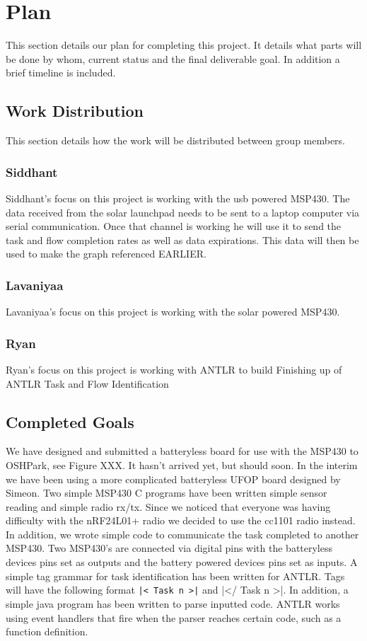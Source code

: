 \section{Plan} %
\label{sec:plan}

This section details our plan for completing this project.
It details what parts will be done by whom, current status and the final deliverable goal.
In addition a brief timeline is included.


\subsection{Work Distribution}

This section details how the work will be distributed between group members.

\subsubsection{Siddhant}
Siddhant's focus on this project is working with the usb powered MSP430.
The data received from the solar launchpad needs to be sent to a laptop computer via serial communication.
Once that channel is working he will use it to send the task and flow completion rates as well as data expirations.
This data will then be used to make the graph referenced EARLIER.

\subsubsection{Lavaniyaa}
Lavaniyaa's focus on this project is working with the solar powered MSP430.

\subsubsection{Ryan}
Ryan's focus on this project is working with ANTLR to build
Finishing up of ANTLR Task and Flow Identification

\subsection{Completed Goals}

We have designed and submitted a batteryless board for use with the MSP430 to OSHPark, see Figure XXX.
It hasn't arrived yet, but should soon.
In the interim we have been using a more complicated batteryless UFOP board designed by Simeon.
Two simple MSP430 C programs have been written simple sensor reading and simple radio rx/tx.
Since we noticed that everyone was having difficulty with the nRF24L01+ radio we decided to use the cc1101 radio instead.
In addition, we wrote simple code to communicate the task completed to another MSP430.
Two MSP430's are connected via digital pins with the batteryless devices pins set as outputs and the battery powered devices pins set as inputs.
A simple tag grammar for task identification has been written for ANTLR.
Tags will have the following format {\tt |< Task n >|} and |</ Task n >|.
In addition, a simple java program has been written to parse inputted code.
ANTLR works using event handlers that fire when the parser reaches certain code, such as a function definition.

